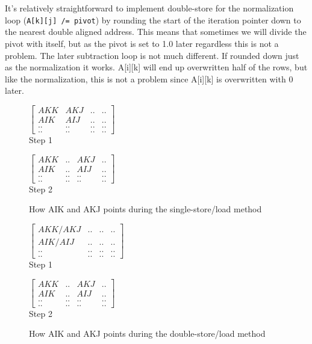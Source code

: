 \documentclass{article}
\begin{document}
\\\\
It's relatively straightforward to implement double-store for the normalization loop (\verb!A[k][j] /= pivot!) by rounding the start of the iteration pointer down to the nearest double aligned address. This means that sometimes we will divide the pivot with itself, but as the pivot is set to 1.0 later regardless this is not a problem. The later subtraction loop is not much different. If rounded down just as the normalization it works. A[i][k] will end up overwritten half of the rows, but like the normalization, this is not a problem since A[i][k] is overwritten with 0 later.
\begin{figure}[h]
  \begin{minipage}{.45\linewidth}
    \centering
    $\begin{bmatrix}
      AKK & AKJ & .. & ..\\
      AIK & AIJ & .. & ..\\
      ..  & ..  & .. & ..\\
      ..  & ..  & .. & ..
    \end{bmatrix}$\\
    Step 1
  \end{minipage}
  \begin{minipage}{.45\linewidth}
    \centering
    $\begin{bmatrix}
      AKK & .. & AKJ & ..\\
      AIK & .. & AIJ & ..\\
      ..  & ..  & .. & ..\\
      ..  & ..  & .. & ..
    \end{bmatrix}$\\
    Step 2
  \end{minipage}
  \caption{How AIK and AKJ points during the single-store/load method}
\end{figure}
\begin{figure}[h]
  \begin{minipage}{.45\linewidth}
    \centering
    $\begin{bmatrix}
      AKK / AKJ & .. & .. & ..\\
      AIK / AIJ & .. & .. & ..\\
      ..  & ..  & .. & ..\\
      ..  & ..  & .. & ..
    \end{bmatrix}$\\Step 1
  \end{minipage}
  \begin{minipage}{.45\linewidth}
    \centering
    $\begin{bmatrix}
      AKK & .. & AKJ & ..\\
      AIK & .. & AIJ & ..\\
      ..  & ..  & .. & ..\\
      ..  & ..  & .. & ..
    \end{bmatrix}$\\
    Step 2
  \end{minipage}
  \caption{How AIK and AKJ points during the double-store/load method}
\end{figure}\\
\end{document}

